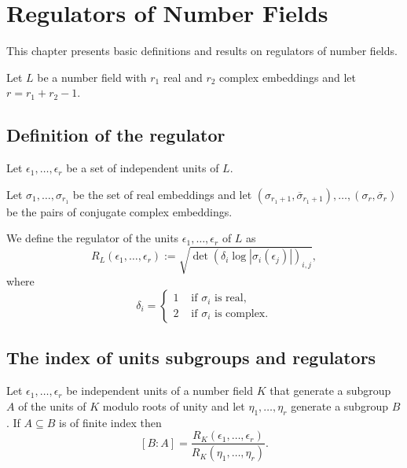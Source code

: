 \chapter{Regulators of Number Fields}
This chapter presents basic definitions and results on regulators of number fields.

Let $L$ be a number field with $r_1$ real and $r_2$ complex embeddings and let $r = r_1 + r_2 - 1$. 

\section{Definition of the regulator}\label{sec:regulator}

Let $\epsilon_1, \dots, \epsilon_r$ be a set of independent units of $L$. 

\begin{definition}\label{defn:mixed_embeddings}
    \leanok
    Let $\sigma_1, \dots, \sigma_{r_1}$ 
    be the set of real embeddings and let $(\sigma_{r_1 + 1}, \overline{\sigma}_{r_1 + 1}), \dots, (\sigma_{r}, \overline{\sigma}_{r})$ be the 
    pairs of conjugate complex embeddings.
\end{definition}

\begin{definition}\label{defn:regulator}
    \leanok
    We define the regulator of the units $\epsilon_1, \dots, \epsilon_r$ of $L$ as 
    $$
    R_L(\epsilon_1, \dots, \epsilon_r) := \sqrt{\det(\delta_{i} \log | \sigma_i(\epsilon_j) | )_{i, j}}, 
    $$
    where 
    $$
    \delta_i = 
    \begin{cases}
    1 & \text{ if } \sigma_i \text{ is real}, \\
    2 & \text{ if } \sigma_i \text{ is complex}.
    \end{cases}
    $$
\end{definition}

\section{The index of units subgroups and regulators}

\begin{lemma}\label{lem:index_eq_reg_ratio}
    Let $\epsilon_1, \dots, \epsilon_r$ be independent units of a number field $K$ that generate a subgroup 
    $A$ of the units of $K$ modulo roots of unity and let $\eta_1, \dots, \eta_r$ generate a subgroup 
    $B$. If $A \subseteq B$ is of finite index then 
    $$
        [B : A] = \frac{R_K(\epsilon_1, \dots, \epsilon_r)}{R_K(\eta_1, \dots, \eta_r)}.
    $$
\end{lemma}

